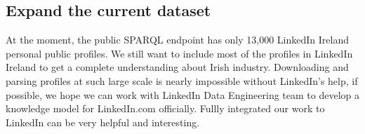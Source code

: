 \subsection{Expand the current dataset}
At the moment, the public SPARQL endpoint has only 13,000 LinkedIn Ireland personal public profiles. We still want to include most of the profiles in LinkedIn Ireland to get a complete understanding about Irish industry. Downloading and parsing profiles at such large scale is nearly impossible without LinkedIn's help, if possible, we hope we can work with LinkedIn Data Engineering team to develop a knowledge model for LinkedIn.com officially. Fullly integrated our work to LinkedIn can be very helpful and interesting.